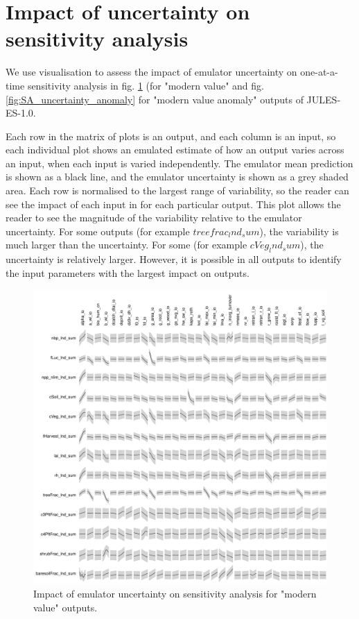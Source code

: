 \documentclass[gmd, manuscript]{copernicus}
\begin{document}
\clearpage


\section{Impact of uncertainty on sensitivity analysis}\label{app:sa_uncertainty}

We use visualisation to assess the impact of emulator uncertainty on one-at-a-time sensitivity analysis in fig. \ref{fig:SA_uncertainty} (for "modern value" and fig. \ref{fig:SA_uncertainty_anomaly} for "modern value anomaly" outputs of JULES-ES-1.0.

Each row in the matrix of plots is an output, and each column is an input, so each individual plot shows an emulated estimate of how an output varies across an input, when each input is varied independently. The emulator mean prediction is shown as a black line, and the emulator uncertainty is shown as a grey shaded area. Each row is normalised to the largest range of variability, so the reader can see the impact of each input in for each particular output. This plot allows the reader to see the magnitude of the variability relative to the emulator uncertainty. For some outputs (for example $treefrac_lnd_sum$), the variability is much larger than the uncertainty. For some (for example $cVeg_lnd_sum$), the uncertainty is relatively larger. However, it is possible in all outputs to identify the input parameters with the largest impact on outputs. 

\begin{figure}[ht]
\includegraphics[width=12cm]{./figs/figA07.pdf}
\caption{Impact of emulator uncertainty on sensitivity analysis for "modern value" outputs.}
\label{fig:SA_uncertainty}
\end{figure}
\end{document}
